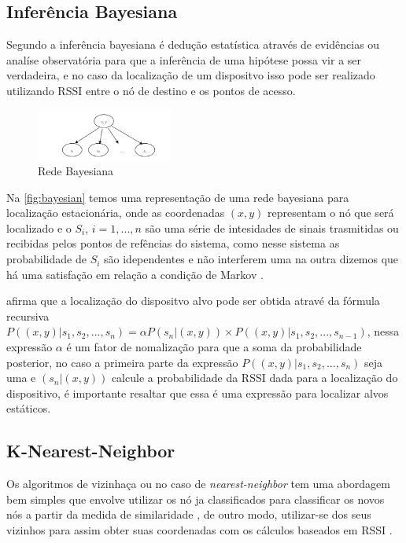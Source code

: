     \subsection{Inferência Bayesiana}
  Segundo \citeauthor{bayesian2001} a inferência bayesiana é dedução estatística através de evidências ou analíse observatória para que a inferência de uma hipótese possa vir a ser verdadeira, e no caso da localização de um dispositvo isso pode ser realizado utilizando RSSI entre o nó de destino e os pontos de acesso.


    \begin{figure}[H]
              \caption{\label{fig:bayesian}{Rede Bayesiana}}
              \centering
              \includegraphics[width=0.4\textwidth]{Figuras/bayesian_network.PNG}
        \end{figure}

        Na \autoref{fig:bayesian} temos uma representação de uma rede bayesiana para localização estacionária, onde as coordenadas $(x,y)$ representam o nó que será localizado e o $S_i$, $i=1,...,n$ são uma série de intesidades de sinais trasmitidas ou recibidas pelos pontos de refências do sistema, como nesse sistema as probabilidade de $S_i$ são idependentes e não interferem uma na outra dizemos que há uma satisfação em relação a condição de Markov \cite{rfid2009review}.
        \par
        \citeauthor{rfid2009review} afirma que a localização do dispositvo alvo pode ser obtida atravé da fórmula recursiva 
        $P((x,y) | s_1, s_2, ..., s_n) = \alpha P(s_n | (x,y)) \times P((x,y) | s_1,s_2, ...,s_{n-1})$, nessa expressão $\alpha$ é um fator de nomalização para que a soma da probabilidade posterior, no caso a primeira parte da expressão $P((x,y) | s_1, s_2, ..., s_n)$ seja uma e $(s_n | (x,y))$ calcule a probabilidade da RSSI dada para a localização do dispositivo, é importante resaltar que essa é uma expressão para localizar alvos estáticos. 
        
    \subsection{K-Nearest-Neighbor}
    Os algoritmos de vizinhaça ou no caso de \textit{nearest-neighbor} tem uma abordagem bem simples que envolve utilizar os nó ja classificados para classificar os novos nós a partir da medida de similaridade \cite{knn-3dLAN}, de outro modo, utilizar-se dos seus vizinhos para assim obter suas coordenadas com os cálculos baseados em RSSI \cite{rfid2009review}.

